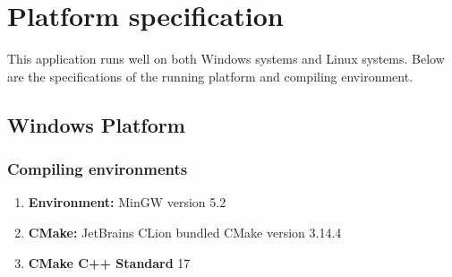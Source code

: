 \documentclass[a4paper]{report}
\begin{document}
\chapter{Platform specification}
This application runs well on both Windows systems and Linux systems. Below are the specifications of the running platform and compiling environment.
\section{Windows Platform}
\subsection{Compiling environments}
\begin{enumerate}
\item
\textbf{Environment:} MinGW version 5.2
\item
\textbf{CMake:} JetBrains CLion bundled CMake version 3.14.4
\item
\textbf{CMake C++ Standard} 17
\end{enumerate}
\end{document}
